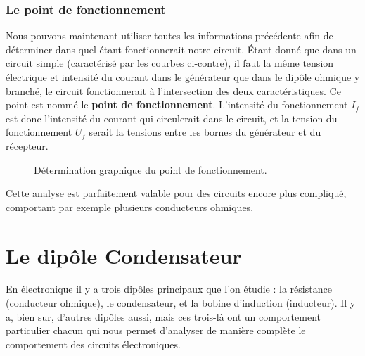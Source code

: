 \documentclass[11pt,a4paper]{article}
\begin{document}
\subsubsection*{Le point de fonctionnement}

Nous pouvons maintenant utiliser toutes les informations précédente afin de déterminer dans quel étant fonctionnerait notre circuit. Étant donné que dans un circuit simple (caractérisé par les courbes ci-contre), il faut la même tension électrique et intensité du courant dans le générateur que dans le dipôle ohmique y branché, le circuit fonctionnerait à l'intersection des deux caractéristiques. Ce point est nommé le \textbf{point de fonctionnement}. L'intensité du fonctionnement $I_f$ est donc l'intensité du courant qui circulerait dans le circuit, et la tension du fonctionnement $U_f$ serait la tensions entre les bornes du générateur et du récepteur. 

\begin{figure}[h]
\centering
\caption{Détermination graphique du point de fonctionnement.}
\end{figure}

Cette analyse est parfaitement valable pour des circuits encore plus compliqué, comportant par exemple plusieurs conducteurs ohmiques. 

\section{Le dipôle Condensateur}
En électronique il y a trois dipôles principaux que l'on étudie : la résistance (conducteur ohmique), le condensateur, et la bobine d'induction (inducteur). Il y a, bien sur, d'autres dipôles aussi, mais ces trois-là ont un comportement particulier chacun qui nous permet d'analyser de manière complète le comportement des circuits électroniques. 
\end{document}
